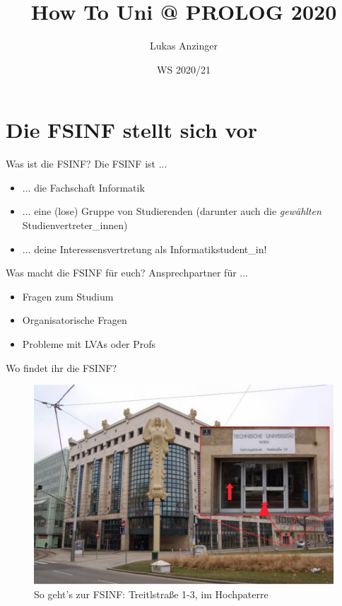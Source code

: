 \documentclass{beamer}
\title{How To Uni @ PROLOG 2020}
\date{WS 2020/21}
\author{Lukas Anzinger}
\begin{document}
\begin{frame}
    \maketitle
\end{frame}

\section{Die FSINF stellt sich vor}

\begin{frame}{Was ist die FSINF?}
    Die FSINF ist ...
    \begin{itemize}
        \item ... die Fachschaft Informatik
        \item ... eine (lose) Gruppe von Studierenden (darunter auch die
            \textit{gewählten} Studienvertreter\_innen)
        \item ... deine Interessensvertretung als Informatikstudent\_in!
    \end{itemize}
\end{frame}

\begin{frame}{Was macht die FSINF für euch?}
    Ansprechpartner für ...
    \begin{itemize}
        \item Fragen zum Studium
        \item Organisatorische Fragen
        \item Probleme mit LVAs oder Profs
    \end{itemize}
\end{frame}

\begin{frame}{Wo findet ihr die FSINF?}
    \begin{figure}[htp]
        \centering
        \includegraphics[width=\textwidth]{fsinf.jpg}
        \caption{So geht's zur FSINF: Treitlstraße 1-3, im Hochpaterre}
    \end{figure}
\end{frame}
\end{document}
